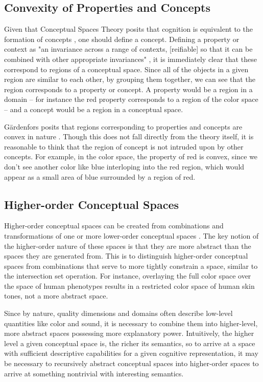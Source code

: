 \subsection{Convexity of Properties and Concepts}
\label{section:convexity-properties-concepts}

Given that Conceptual Spaces Theory posits that cognition is equivalent to the formation of concepts \citep{gardenfors2004conceptual}, one should define a concept.  Defining a property or context as "an invariance across a range of contexts, [reifiable] so that it can be combined with other appropriate invariances" \citep{kirsh1991today}, it is immediately clear that these correspond to regions of a conceptual space.  Since all of the objects in a given region are similar to each other, by grouping them together, we can see that the region corresponds to a property or concept.  A property would be a region in a domain -- for instance the red property corresponds to a region of the color space -- and a concept would be a region in a conceptual space.

G{\"a}rdenfors posits that regions corresponding to properties and concepts are convex in nature \citep{gardenfors2004conceptual}.  Though this does not fall directly from the theory itself, it is reasonable to think that the region of concept is not intruded upon by other concepts.  For example, in the color space, the property of red is convex, since we don't see another color like blue interloping into the red region, which would appear as a small area of blue surrounded by a region of red.

\subsection{Higher-order Conceptual Spaces}
\label{section:higher-order-conceptual-spaces}

Higher-order conceptual spaces can be created from combinations and transformations of one or more lower-order conceptual spaces \citep{gardenfors2004conceptual}.  The key notion of the higher-order nature of these spaces is that they are more abstract than the spaces they are generated from.  This is to distinguish higher-order conceptual spaces from combinations that serve to more tightly constrain a space, similar to the intersection set operation.  For instance, overlaying the full color space over the space of human phenotypes results in a restricted color space of human skin tones, not a more abstract space.

Since by nature, quality dimensions and domains often describe low-level quantities like color and sound, it is necessary to combine them into higher-level, more abstract spaces possessing more explanatory power.  Intuitively, the higher level a given conceptual space is, the richer its semantics, so to arrive at a space with sufficient descriptive capabilities for a given cognitive representation, it may be necessary to recursively abstract conceptual spaces into higher-order spaces to arrive at something nontrivial with interesting semantics.
